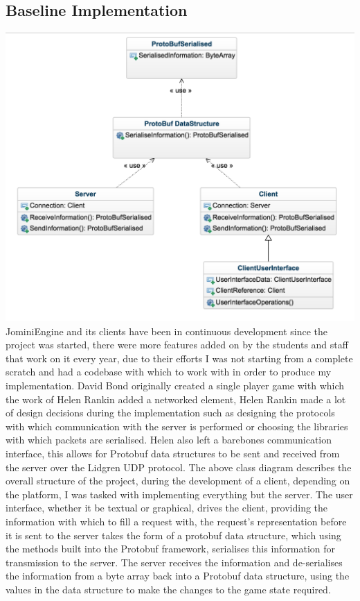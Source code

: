 \documentclass{article}
\begin{document}
\subsection{Baseline Implementation}
\includegraphics[width=\textwidth]{classdiagram.png}
JominiEngine and its clients have been in continuous development since the project was started, there were more features added on by the students and staff that work on it every year, due to their efforts I was not starting from a complete scratch and had a codebase with which to work with in order to produce my implementation. David Bond originally created a single player game with which the work of Helen Rankin\cite{helenrankin} added a networked element, Helen Rankin made a lot of design decisions during the implementation such as designing the protocols with which communication with the server is performed or choosing the libraries with which packets are serialised. Helen also left a barebones communication interface, this allows for Protobuf data structures to be sent and received from the server over the Lidgren UDP protocol. The above class diagram describes the overall structure of the project, during the development of a client, depending on the platform, I was tasked with implementing everything but the server. The user interface, whether it be textual or graphical, drives the client, providing the information with which to fill a request with, the request's representation before it is sent to the server takes the form of a protobuf data structure, which using the methods built into the Protobuf framework, serialises this information for transmission to the server. The server receives the information and de-serialises the information from a byte array back into a Protobuf data structure, using the values in the data structure to make the changes to the game state required.
\end{document}
